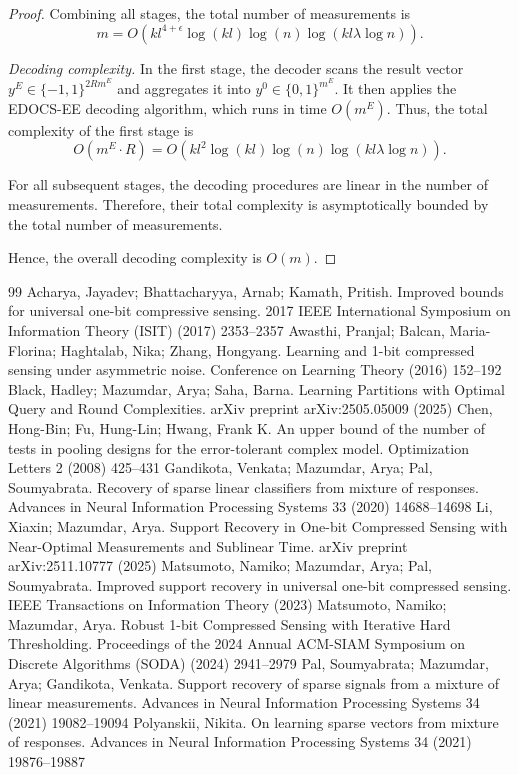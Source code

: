 \documentclass[10pt,a4paper]{amsart}
\begin{document}
\begin{proof}
Combining all stages, the total number of measurements is
\[
m = O\!\left(kl^{4+\epsilon} \log(kl)\log (n) \log(kl\lambda \log n)\right).
\]

\medskip

\emph{Decoding complexity.}
In the first stage, the decoder scans the result vector $y^E \in \{-1,1\}^{2R m^E}$ and aggregates it into $y^0 \in \{0,1\}^{m^E}$. It then applies the EDOCS-EE decoding algorithm, which runs in time $O(m^E)$. Thus, the total complexity of the first stage is
\[
O(m^E \cdot R)
= O\!\left(kl^2 \log(kl)\log (n) \log(kl\lambda \log n)\right).
\]

For all subsequent stages, the decoding procedures are linear in the number of measurements. Therefore, their total complexity is asymptotically bounded by the total number of measurements.

\medskip

Hence, the overall decoding complexity is
$O(m)$.
\end{proof}

\begin{thebibliography}{99}
 Acharya, Jayadev; Bhattacharyya, Arnab; Kamath, Pritish. Improved bounds for universal one-bit compressive sensing. 2017 IEEE International Symposium on Information Theory (ISIT) (2017) 2353--2357
 Awasthi, Pranjal; Balcan, Maria-Florina; Haghtalab, Nika; Zhang, Hongyang. Learning and 1-bit compressed sensing under asymmetric noise. Conference on Learning Theory (2016) 152--192
 Black, Hadley; Mazumdar, Arya; Saha, Barna. Learning Partitions with Optimal Query and Round Complexities. arXiv preprint arXiv:2505.05009 (2025)
 Chen, Hong-Bin; Fu, Hung-Lin; Hwang, Frank K. An upper bound of the number of tests in pooling designs for the error-tolerant complex model. Optimization Letters 2 (2008) 425--431
 Gandikota, Venkata; Mazumdar, Arya; Pal, Soumyabrata. Recovery of sparse linear classifiers from mixture of responses. Advances in Neural Information Processing Systems 33 (2020) 14688--14698
 Li, Xiaxin; Mazumdar, Arya. Support Recovery in One-bit Compressed Sensing with Near-Optimal Measurements and Sublinear Time. arXiv preprint arXiv:2511.10777 (2025)
 Matsumoto, Namiko; Mazumdar, Arya; Pal, Soumyabrata. Improved support recovery in universal one-bit compressed sensing. IEEE Transactions on Information Theory (2023)
 Matsumoto, Namiko; Mazumdar, Arya. Robust 1-bit Compressed Sensing with Iterative Hard Thresholding. Proceedings of the 2024 Annual ACM-SIAM Symposium on Discrete Algorithms (SODA) (2024) 2941--2979
 Pal, Soumyabrata; Mazumdar, Arya; Gandikota, Venkata. Support recovery of sparse signals from a mixture of linear measurements. Advances in Neural Information Processing Systems 34 (2021) 19082--19094
 Polyanskii, Nikita. On learning sparse vectors from mixture of responses. Advances in Neural Information Processing Systems 34 (2021) 19876--19887
\end{thebibliography}
\end{document}
